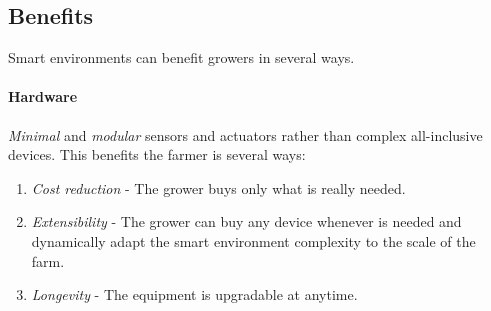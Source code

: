 

\subsection{Benefits}\label{sec:benefits}

Smart environments can benefit growers in several ways.

\paragraph{Hardware}
\emph{Minimal} and \emph{modular} 
sensors and actuators rather than complex all-inclusive devices.
This benefits the farmer is several ways:
\begin{enumerate}
    \item \emph{Cost reduction} - The grower buys only
    what is really needed.
    \item \emph{Extensibility} -  The grower can buy any device whenever is needed and dynamically adapt the smart environment complexity to the scale of the farm.
    \item \emph{Longevity} - The equipment is upgradable at anytime.
\end{enumerate}

